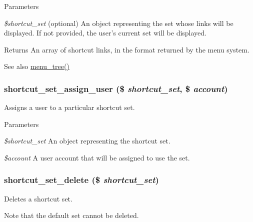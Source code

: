 \begin{DoxyParams}{Parameters}
\item[{\em \$shortcut\_\-set}](optional) An object representing the set whose links will be displayed. If not provided, the user's current set will be displayed. \end{DoxyParams}
\begin{DoxyReturn}{Returns}
An array of shortcut links, in the format returned by the menu system.
\end{DoxyReturn}
\begin{DoxySeeAlso}{See also}
\hyperlink{group__menu_ga91022785ee027528b5cee2faff31f62f}{menu\_\-tree()} 
\end{DoxySeeAlso}
\hypertarget{shortcut_8module_aaefdb5748cc6ecd805160b8c6eafc1e0}{
\subsubsection[{shortcut\_\-set\_\-assign\_\-user}]{\setlength{\rightskip}{0pt plus 5cm}shortcut\_\-set\_\-assign\_\-user (\$ {\em shortcut\_\-set}, \/  \$ {\em account})}}
\label{shortcut_8module_aaefdb5748cc6ecd805160b8c6eafc1e0}
Assigns a user to a particular shortcut set.


\begin{DoxyParams}{Parameters}
\item[{\em \$shortcut\_\-set}]An object representing the shortcut set. \item[{\em \$account}]A user account that will be assigned to use the set. \end{DoxyParams}
\hypertarget{shortcut_8module_a987f27dfd278b46248c06c90b98b7aca}{
\subsubsection[{shortcut\_\-set\_\-delete}]{\setlength{\rightskip}{0pt plus 5cm}shortcut\_\-set\_\-delete (\$ {\em shortcut\_\-set})}}
\label{shortcut_8module_a987f27dfd278b46248c06c90b98b7aca}
Deletes a shortcut set.

Note that the default set cannot be deleted.


